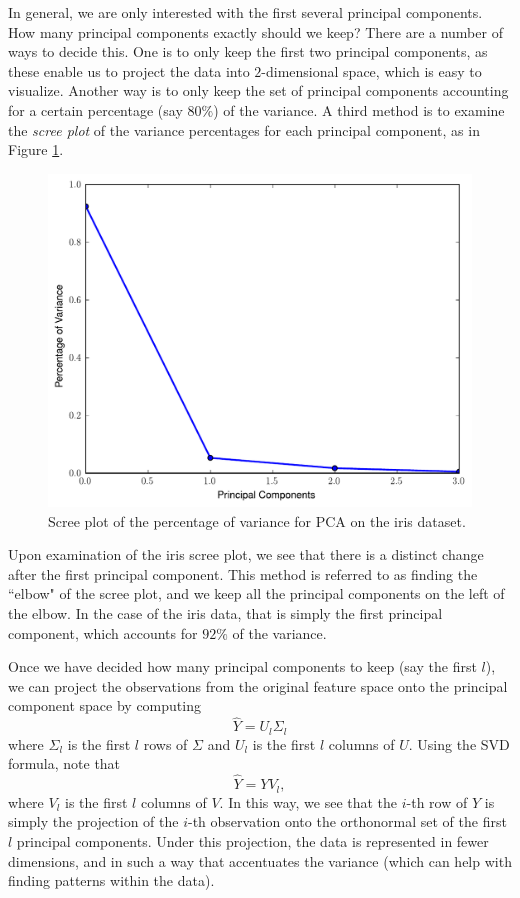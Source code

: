 In general, we are only interested with the first several principal components. How many principal components exactly should we keep? There are a number of ways to decide this. One is to only keep the first two principal components, as these enable us to project the data into $2$-dimensional space, which is easy to visualize. Another way is to only keep the set of principal components accounting for a certain percentage (say $80\%$) of the variance. A third method is to examine the \emph{scree plot} of the variance percentages for each principal component, as in Figure \ref{fig:iris_scree}.
\begin{figure}
\includegraphics[width=\textwidth]{iris_scree.pdf}
\caption{Scree plot of the percentage of variance for PCA on the iris dataset.}
\label{fig:iris_scree}
\end{figure}
Upon examination of the iris scree plot, we see that there is a distinct change after the first principal component. This method is referred to as finding the ``elbow" of the scree plot, and we keep all the principal components on the left of the elbow. In the case of the iris data, that is simply the first principal component, which accounts for $92\%$ of the variance.

Once we have decided how many principal components to keep (say the first $l$), we can project the observations from the original feature space onto the principal component space by computing
\begin{equation*}
\widehat{Y} = U_l\Sigma_l
\end{equation*}
where $\Sigma_l$ is the first $l$ rows of $\Sigma$ and $U_l$ is the first $l$ columns of $U$.
Using the SVD formula, note that
\[
\widehat{Y} = YV_l,
\]
where $V_l$ is the first $l$ columns of $V$.
In this way, we see that the $i$-th row of $\widehat{Y}$ is simply the projection of the $i$-th observation onto the orthonormal set of the first $l$ principal components.
Under this projection, the data is represented in fewer dimensions, and in such a way that accentuates the variance (which can help with finding patterns within the data).

